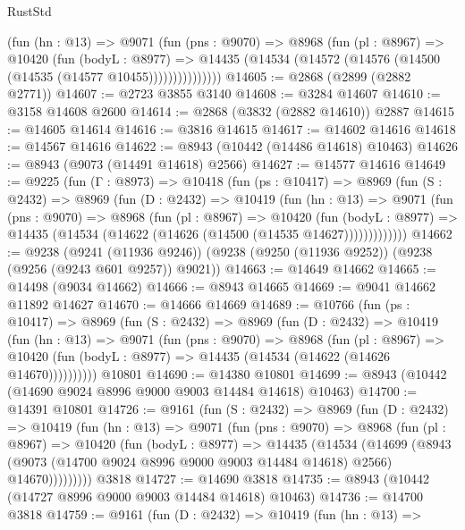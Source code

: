 \begin{lexlean}{RustStd}
\begin{coremodule}
              (fun (hn : @13) =>
              @9071
                (fun (pns : @9070) =>
                @8968
                  (fun (pl : @8967) =>
                  @10420
                    (fun (bodyL : @8977) =>
                    @14435 (@14534 (@14572 (@14576 (@14500 (@14535 (@14577 @10455)))))))))))))))
@14605 := @2868 (@2899 (@2882 @2771))
@14607 := @2723 @3855 @3140
@14608 := @3284 @14607
@14610 := @3158 @14608 @2600
@14614 := @2868 (@3832 (@2882 @14610)) @2887
@14615 := @14605 @14614
@14616 := @3816 @14615
@14617 := @14602 @14616
@14618 := @14567 @14616
@14622 := @8943 (@10442 (@14486 @14618) @10463)
@14626 := @8943 (@9073 (@14491 @14618) @2566)
@14627 := @14577 @14616
@14649 := @9225
    (fun (Γ : @8973) =>
    @10418
      (fun (ps : @10417) =>
      @8969
        (fun (S : @2432) =>
        @8969
          (fun (D : @2432) =>
          @10419
            (fun (hn : @13) =>
            @9071
              (fun (pns : @9070) =>
              @8968
                (fun (pl : @8967) =>
                @10420
                  (fun (bodyL : @8977) =>
                  @14435 (@14534 (@14622 (@14626 (@14500 (@14535 @14627)))))))))))))
@14662 := @9238
    (@9241 (@11936 @9246))
    (@9238 (@9250 (@11936 @9252)) (@9238 (@9256 (@9243 @601 @9257)) @9021))
@14663 := @14649 @14662
@14665 := @14498 (@9034 @14662)
@14666 := @8943 @14665
@14669 := @9041 @14662 @11892 @14627
@14670 := @14666 @14669
@14689 := @10766
    (fun (ps : @10417) =>
    @8969
      (fun (S : @2432) =>
      @8969
        (fun (D : @2432) =>
        @10419
          (fun (hn : @13) =>
          @9071
            (fun (pns : @9070) =>
            @8968
              (fun (pl : @8967) =>
              @10420 (fun (bodyL : @8977) => @14435 (@14534 (@14622 (@14626 @14670))))))))))
    @10801
@14690 := @14380 @10801
@14699 := @8943 (@10442 (@14690 @9024 @8996 @9000 @9003 @14484 @14618) @10463)
@14700 := @14391 @10801
@14726 := @9161
    (fun (S : @2432) =>
    @8969
      (fun (D : @2432) =>
      @10419
        (fun (hn : @13) =>
        @9071
          (fun (pns : @9070) =>
          @8968
            (fun (pl : @8967) =>
            @10420
              (fun (bodyL : @8977) =>
              @14435
                (@14534
                  (@14699
                    (@8943
                      (@9073 (@14700 @9024 @8996 @9000 @9003 @14484 @14618) @2566)
                      @14670)))))))))
    @3818
@14727 := @14690 @3818
@14735 := @8943 (@10442 (@14727 @8996 @9000 @9003 @14484 @14618) @10463)
@14736 := @14700 @3818
@14759 := @9161
    (fun (D : @2432) =>
    @10419
      (fun (hn : @13) =>

\end{coremodule}
\end{lexlean}
